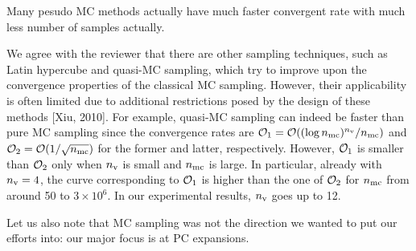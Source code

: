 \begin{reviewer}
Many pesudo MC methods actually have much faster convergent rate with much less number of samples actually.
\end{reviewer}
\begin{authors}
We agree with the reviewer that there are other sampling techniques, such as Latin hypercube and quasi-MC sampling, which try to improve upon the convergence properties of the classical MC sampling.
However, their applicability is often limited due to additional restrictions posed by the design of these methods [Xiu, 2010].
For example, quasi-MC sampling can indeed be faster than pure MC sampling since the convergence rates are $\mathcal{O}_1 = \mathcal{O}((\log{n_\text{mc}})^{n_\text{v}} / {n_\text{mc}})$ and $\mathcal{O}_2 = \mathcal{O}(1 / \sqrt{{n_\text{mc}}})$ for the former and latter, respectively.
However, $\mathcal{O}_1$ is smaller than $\mathcal{O}_2$ only when ${n_\text{v}}$ is small and ${n_\text{mc}}$ is large.
In particular, already with ${n_\text{v}} = 4$, the curve corresponding to $\mathcal{O}_1$ is higher than the one of $\mathcal{O}_2$ for ${n_\text{mc}}$ from around 50 to $3 \times 10^6$.
In our experimental results, ${n_\text{v}}$ goes up to 12.

Let us also note that MC sampling was not the direction we wanted to put our efforts into: our major focus is at PC expansions.

\begin{actions}
\end{actions}
\end{authors}

